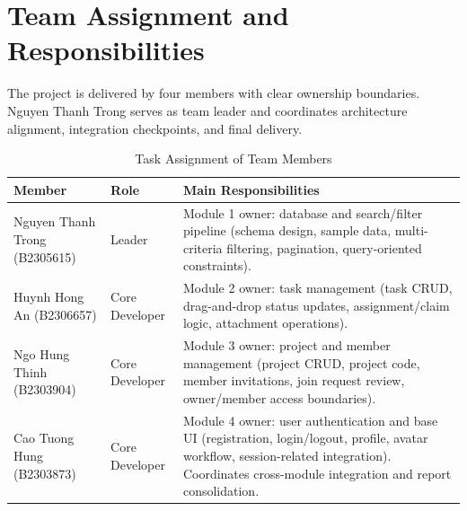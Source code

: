 \section{Team Assignment and Responsibilities}

The project is delivered by four members with clear ownership boundaries.
Nguyen Thanh Trong serves as team leader and coordinates architecture alignment,
integration checkpoints, and final delivery.

\begin{table}[H]
\centering
\caption{Task Assignment of Team Members}
\begin{tabularx}{\textwidth}{L{0.30\textwidth} L{0.15\textwidth} X}
\toprule
\textbf{Member} & \textbf{Role} & \textbf{Main Responsibilities} \\
\midrule
Nguyen Thanh Trong (B2305615) & Leader &
Module 1 owner: database and search/filter pipeline (schema design, sample data, multi-criteria filtering, pagination, query-oriented constraints). \\
Huynh Hong An (B2306657) & Core Developer &
Module 2 owner: task management (task CRUD, drag-and-drop status updates, assignment/claim logic, attachment operations). \\
Ngo Hung Thinh (B2303904) & Core Developer &
Module 3 owner: project and member management (project CRUD, project code, member invitations, join request review, owner/member access boundaries). \\
Cao Tuong Hung (B2303873) & Core Developer &
Module 4 owner: user authentication and base UI (registration, login/logout, profile, avatar workflow, session-related integration). Coordinates cross-module integration and report consolidation. \\
\bottomrule
\end{tabularx}
\end{table}
